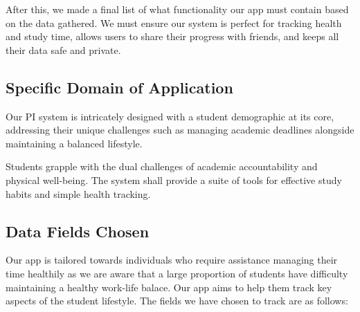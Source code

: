 \documentclass[12pt]{article}
\begin{document}
After this, we made a final list of what functionality our app must contain based on the data gathered. We must
ensure our system is perfect for tracking health and study time, allows users
to share their progress with friends, and keeps all their data safe and
private.
 

\subsection{Specific Domain of Application}

Our PI system is intricately designed with a student demographic at its core,
addressing their unique challenges such as managing academic deadlines
alongside maintaining a balanced lifestyle.\par 

Students grapple with the dual challenges of academic accountability and
physical well-being. The system shall provide a suite of tools for effective
study habits and simple health tracking.
 

\subsection{Data Fields Chosen}

Our app is tailored towards individuals who require assistance managing their time healthily as
we are aware that a large proportion of students have difficulty maintaining a healthy work-life
balace. Our app aims to help them track key aspects of the student lifestyle.
The fields we have chosen to track are as follows:
\end{document}
